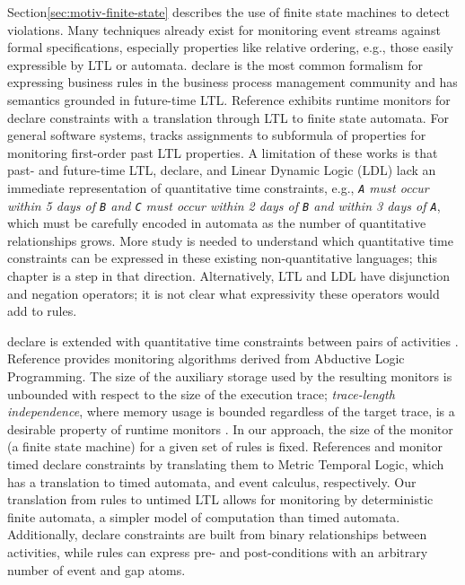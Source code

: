 Section\:\ref{sec:motiv-finite-state} describes
the use of finite state machines to detect violations.
Many techniques already exist for monitoring event streams against formal specifications,
especially properties like relative ordering,
e.g., those easily expressible by LTL or automata.
{\sc declare} \cite{pesic2007declare}
is the most common formalism for expressing business rules
in the business process management community
and has semantics grounded in future-time LTL.
Reference \cite{maggi2011monitoring} exhibits runtime monitors
for {\sc declare} constraints
with a translation through LTL to finite state automata.
For general software systems, \cite{havelund2018efficient}
tracks assignments to subformula of properties for monitoring first-order past LTL properties.
A limitation of these works is that
past- and future-time LTL, {\sc declare}, and Linear Dynamic Logic (LDL)
lack an immediate representation
of quantitative time constraints,
e.g., {\em {\tt A} must occur within 5 days of {\tt B}
and {\tt C} must occur within 2 days of {\tt B} and within 3 days of {\tt A}},
which must be carefully encoded in automata as the number of quantitative relationships grows.
More study is needed to understand which quantitative time constraints
can be expressed in these existing non-quantitative languages;
this chapter is a step in that direction.
Alternatively, LTL and LDL have disjunction and negation operators;
it is not clear what expressivity these operators
would add to rules.

{\sc declare} is extended with quantitative time constraints
between pairs of activities \cite{montali2010declarative, westergaard2012looking}.
Reference \cite{montali2010declarative}
provides monitoring algorithms derived from Abductive Logic Programming.
The size of the auxiliary storage used by the resulting monitors is unbounded
with respect to the size of the execution trace;
{\it trace-length independence}, where memory usage is bounded regardless of the target trace, 
is a desirable property of runtime monitors \cite{bauer2013propositional}.
In our approach,
the size of the monitor (a finite state machine) for a given set of rules is fixed.
References \cite{westergaard2012looking} and \cite{montali2013monitoring}
monitor timed {\sc declare} constraints
by translating them to Metric Temporal Logic,
which has a translation to timed automata,
and event calculus, respectively.
Our translation from rules to untimed LTL
allows for monitoring by deterministic finite automata,
a simpler model of computation than timed automata.
Additionally,
{\sc declare} constraints are built from binary relationships between activities,
while rules can express pre- and post-conditions
with an arbitrary number of event and gap atoms.

